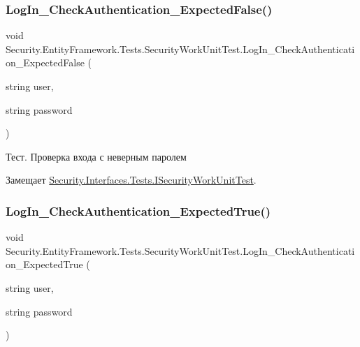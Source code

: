 \subsubsection{\texorpdfstring{Log\+In\+\_\+\+Check\+Authentication\+\_\+\+Expected\+False()}{LogIn\_CheckAuthentication\_ExpectedFalse()}}
{\footnotesize\ttfamily void Security.\+Entity\+Framework.\+Tests.\+Security\+Work\+Unit\+Test.\+Log\+In\+\_\+\+Check\+Authentication\+\_\+\+Expected\+False (\begin{DoxyParamCaption}\item[{string}]{user,  }\item[{string}]{password }\end{DoxyParamCaption})}



Тест. Проверка входа с неверным паролем 



Замещает \hyperlink{interface_security_1_1_interfaces_1_1_tests_1_1_i_security_work_unit_test_ab9261306b37909690ca44c01231e7987}{Security.\+Interfaces.\+Tests.\+I\+Security\+Work\+Unit\+Test}.

\mbox{\label{class_security_1_1_entity_framework_1_1_tests_1_1_security_work_unit_test_a7fa1055e919319077b7507ac458a954e}} 
\subsubsection{\texorpdfstring{Log\+In\+\_\+\+Check\+Authentication\+\_\+\+Expected\+True()}{LogIn\_CheckAuthentication\_ExpectedTrue()}}
{\footnotesize\ttfamily void Security.\+Entity\+Framework.\+Tests.\+Security\+Work\+Unit\+Test.\+Log\+In\+\_\+\+Check\+Authentication\+\_\+\+Expected\+True (\begin{DoxyParamCaption}\item[{string}]{user,  }\item[{string}]{password }\end{DoxyParamCaption})}



